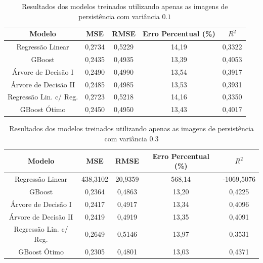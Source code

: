 \begin{table}[htpb!]
\centering
\caption{Resultados dos modelos treinados utilizando apenas as imagens de persistência com variância
$0.1$}
\label{tab:pionly01}
\begin{tabular}{@{}ccccc@{}}
\toprule
Modelo                 & MSE    & RMSE   & Erro Percentual (\%) & $R^2$  \\ \midrule
Regressão Linear       & 0,2734 & 0,5229 & 14,19                & 0,3322 \\
GBoost                 & 0,2435 & 0,4935 & 13,39                & 0,4053 \\
Árvore de Decisão I    & 0,2490 & 0,4990 & 13,54                & 0,3917 \\
Árvore de Decisão II   & 0,2485 & 0,4985 & 13,53                & 0,3931 \\
Regressão Lin. c/ Reg. & 0,2723 & 0,5218 & 14,16                & 0,3350 \\
GBoost Ótimo           & 0,2450 & 0,4950 & 13,43                & 0,4017 \\ \bottomrule
\end{tabular}
\end{table}
\begin{table}[htpb!]
\centering
\caption{Resultados dos modelos treinados utilizando apenas as imagens de persistência com variância
$0.3$}
\label{tab:pionly03}
\begin{tabular}{@{}ccccc@{}}
\toprule
Modelo                 & MSE      & RMSE    & Erro Percentual (\%) & $R^2$      \\ \midrule
Regressão Linear       & 438,3102 & 20,9359 & 568,14               & -1069,5076 \\
GBoost                 & 0,2364   & 0,4863  & 13,20                & 0,4225     \\
Árvore de Decisão I    & 0,2417   & 0,4917  & 13,34                & 0,4096     \\
Árvore de Decisão II   & 0,2419   & 0,4919  & 13,35                & 0,4091     \\
Regressão Lin. c/ Reg. & 0,2649   & 0,5146  & 13,97                & 0,3531     \\
GBoost Ótimo           & 0,2305   & 0,4801  & 13,03                & 0,4371     \\
\bottomrule
\end{tabular}
\end{table}
